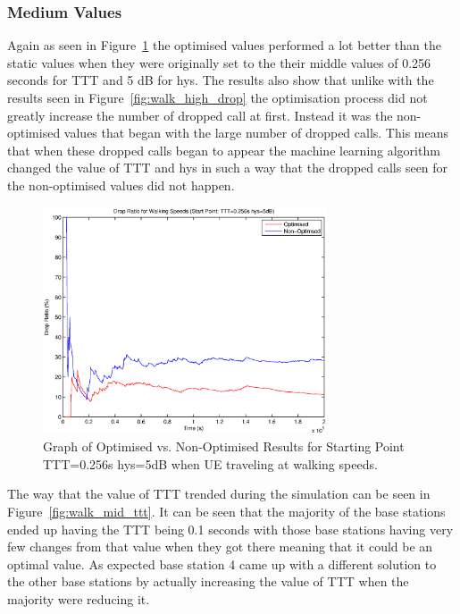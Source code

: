 \subsubsection*{Medium Values}
Again as seen in Figure~\ref{fig:walk_mid_drop} the optimised values performed a lot better than the static values when they were originally set to the their middle values of 0.256 seconds for TTT and 5 dB for hys. The results also show that unlike with the results seen in Figure~\ref{fig:walk_high_drop} the optimisation process did not greatly increase the number of dropped call at first. Instead it was the non-optimised values that began with the large number of dropped calls. This means that when these dropped calls began to appear the machine learning algorithm changed the value of TTT and hys in such a way that the dropped calls seen for the non-optimised values did not happen.
\begin{figure}[H]
  \begin{center}
    	  \includegraphics[width=0.75\textwidth]{figures/walking_figures/mid/long_drop.eps}
    \end{center}
    \caption{Graph of Optimised vs. Non-Optimised Results for Starting Point TTT=0.256s hys=5dB when UE traveling at walking speeds.}
    \label{fig:walk_mid_drop}
\end{figure}
The way that the value of TTT trended during the simulation can be seen in Figure~\ref{fig:walk_mid_ttt}. It can be seen that the majority of the base stations ended up having the TTT being 0.1 seconds with those base stations having very few changes from that value when they got there meaning that it could be an optimal value. As expected base station 4 came up with a different solution to the other base stations by actually increasing the value of TTT when the majority were reducing it.


